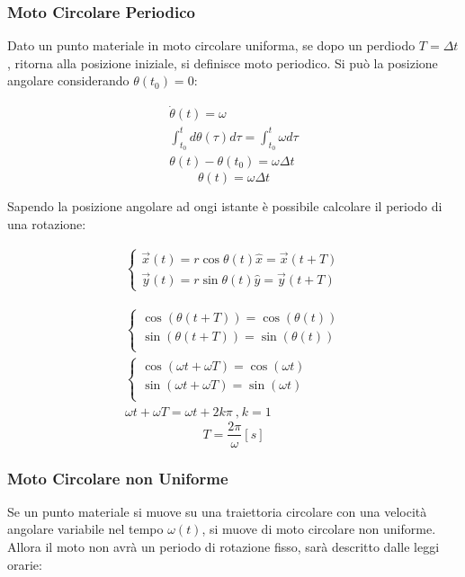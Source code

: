 \documentclass{article}
\numberwithin{equation}{subsection}
\begin{document}
\subsubsection{Moto Circolare Periodico}
Dato un punto materiale in moto circolare uniforma, se dopo un perdiodo 
$T=\Delta t$, ritorna alla posizione iniziale, si definisce moto 
periodico. Si può la posizione angolare considerando 
$\theta(t_0) = 0$: 

\begin{gather*}
    \dot\theta(t) = \omega\\
    \int_{t_0}^{t}d\theta(\tau)d\tau=\int_{t_0}^{t}\omega d\tau\\
    \theta(t)-\theta(t_0)=\omega\Delta t
\end{gather*}
\begin{equation}
    \theta(t)=\omega\Delta t
\end{equation}

Sapendo la posizione angolare ad ongi istante è possibile 
calcolare il periodo di una rotazione:

\begin{align*}
    \begin{cases}
        \vec{x}(t)=r\cos\theta(t)\hat{x}=\vec{x}(t+T)\\
        \vec{y}(t)=r\sin\theta(t)\hat{y}=\vec{y}(t+T)
    \end{cases}
\end{align*}

\begin{gather*}
    \begin{cases}
        \cos(\theta(t+T))=\cos(\theta(t))\\
        \sin(\theta(t+T))=\sin(\theta(t))\\
    \end{cases}\\
    \begin{cases}
        \cos(\omega t +\omega T)=\cos(\omega t)\\
        \sin(\omega t + \omega T)=\sin(\omega  t)\\
    \end{cases}\\
    \omega t +\omega T =\omega t + 2k\pi\:\mbox{,}\:k=1
\end{gather*}
\begin{equation}
    T=\displaystyle\frac{2\pi}{\omega}[s]
\end{equation}

\subsubsection{Moto Circolare non Uniforme}
Se un punto materiale si muove su una traiettoria circolare con 
una velocità angolare variabile nel tempo $\omega(t)$, si muove di moto 
circolare non uniforme. Allora il moto non avrà un periodo 
di rotazione fisso, sarà descritto dalle leggi orarie:
\end{document}
